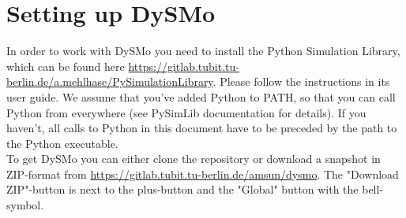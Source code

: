 \section{Setting up DySMo}

In order to work with DySMo you need to install the Python Simulation Library, which can be found here \url{https://gitlab.tubit.tu-berlin.de/a.mehlhase/PySimulationLibrary}.
Please follow the instructions in its user guide.
We assume that you've added Python to PATH, so that you can call Python from everywhere (see PySimLib documentation for details).
If you haven't, all calls to Python in this document have to be preceded by the path to the Python executable.
\\
To get DySMo you can either clone the repository or download a snapshot in ZIP-format from \url{https://gitlab.tubit.tu-berlin.de/amsun/dysmo}.
The "Download ZIP"-button is next to the plus-button and the "Global" button with the bell-symbol.